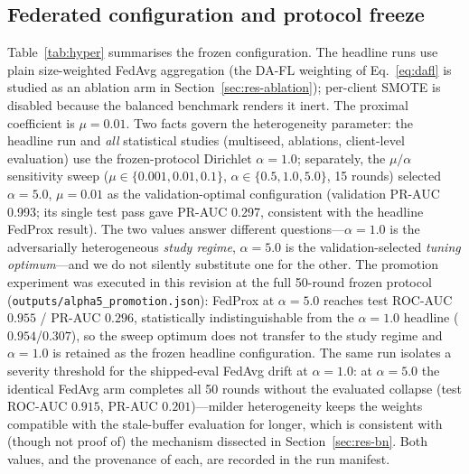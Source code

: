 \subsection{Federated configuration and protocol freeze}
\label{sec:fedconfig}

Table~\ref{tab:hyper} summarises the frozen configuration. The
headline runs use plain size-weighted FedAvg aggregation (the DA-FL
weighting of Eq.~\ref{eq:dafl} is studied as an ablation arm in
Section~\ref{sec:res-ablation}); per-client SMOTE is disabled because
the balanced benchmark renders it inert. The proximal coefficient is
$\mu=0.01$. Two facts govern the heterogeneity parameter: the headline
run and \emph{all} statistical studies (multiseed, ablations,
client-level evaluation) use the frozen-protocol Dirichlet
$\alpha=1.0$; separately, the $\mu/\alpha$ sensitivity sweep
($\mu \in \{0.001, 0.01, 0.1\}$, $\alpha \in \{0.5, 1.0, 5.0\}$,
15 rounds) selected $\alpha=5.0$, $\mu=0.01$ as the
validation-optimal configuration (validation PR-AUC 0.993; its single
test pass gave PR-AUC 0.297, consistent with the headline FedProx
result). The two values answer different questions---$\alpha=1.0$ is
the adversarially heterogeneous \emph{study regime}, $\alpha=5.0$ is
the validation-selected \emph{tuning optimum}---and we do not silently
substitute one for the other. The promotion experiment was executed
in this revision at the full 50-round frozen protocol
(\texttt{outputs/alpha5\_promotion.json}): FedProx at $\alpha=5.0$
reaches test ROC-AUC $0.955$ / PR-AUC $0.296$, statistically
indistinguishable from the $\alpha=1.0$ headline ($0.954$/$0.307$),
so the sweep optimum does not transfer to the study regime and
$\alpha=1.0$ is retained as the frozen headline configuration.
The same run isolates a severity threshold for the shipped-eval FedAvg
drift at $\alpha=1.0$: at $\alpha=5.0$ the identical FedAvg arm
completes all 50 rounds without the evaluated collapse (test ROC-AUC
$0.915$, PR-AUC $0.201$)---milder heterogeneity keeps the weights
compatible with the stale-buffer evaluation for longer, which is
consistent with (though not proof of) the mechanism dissected in
Section~\ref{sec:res-bn}. Both values, and the
provenance of each, are recorded in the run manifest.

